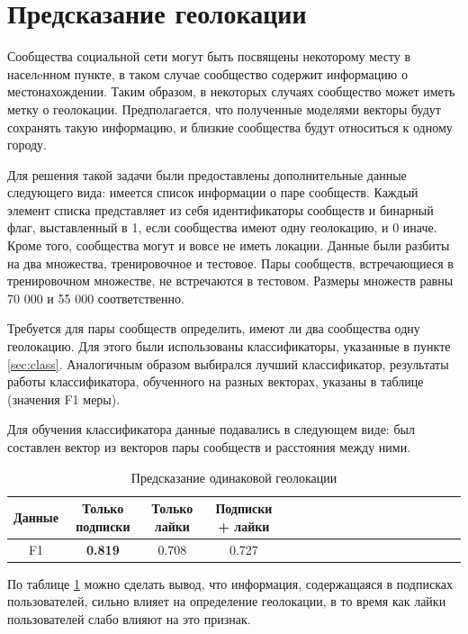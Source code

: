 \documentclass[times,specification,annotation]{itmo-student-thesis}
\begin{document}
\section{Предсказание геолокации} \label{sec:geo}

Сообщества социальной сети могут быть посвящены некоторому месту в населeнном пункте, в таком случае сообщество содержит информацию о местонахождении. Таким образом, в некоторых случаях сообщество может иметь метку о геолокации. Предполагается, что полученные моделями векторы будут сохранять такую информацию, и близкие сообщества будут относиться к одному городу. 

Для решения такой задачи были предоставлены дополнительные данные следующего вида: имеется список информации о паре сообществ. Каждый элемент списка представляет из себя идентификаторы сообществ и бинарный флаг, выставленный в 1, если сообщества имеют одну геолокацию, и 0 иначе. Кроме того, сообщества могут и вовсе не иметь локации. Данные были разбиты на два множества, тренировочное и тестовое. Пары сообществ, встречающиеся в тренировочном множестве, не встречаются в тестовом. Размеры множеств равны 70 000 и 55 000 соответственно.

Требуется для пары сообществ определить, имеют ли два сообщества одну геолокацию. Для этого были использованы классификаторы, указанные в пункте \ref{sec:class}. Аналогичным образом выбирался лучший классификатор, результаты работы классификатора, обученного на разных векторах, указаны в таблице (значения F1 меры). 

Для обучения классификатора данные подавались в следующем виде: был составлен вектор из векторов пары сообществ и расстояния между ними. 

\begin{table}[!h]
\caption{Предсказание одинаковой геолокации} \label{tab2-geo-cmp}
\centering
\begin{tabular}{|*{18}{c|}}\hline
Данные  & Только подписки  & Только лайки & Подписки + лайки \\\hline
F1                        & \textbf{0.819} & 0.708  & 0.727 \\\hline
\end{tabular}
\end{table}

По таблице \ref {tab2-geo-cmp} можно сделать вывод, что информация, содержащаяся в подписках пользователей, сильно влияет на определение геолокации, в то время как лайки пользователей слабо влияют на это признак. 
\end{document}

